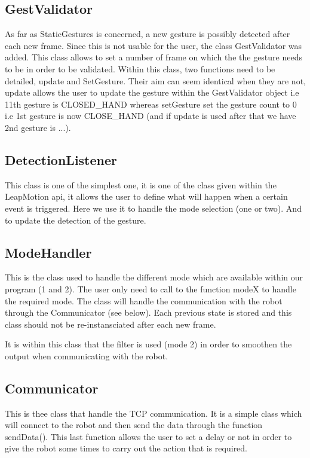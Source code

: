 \subsection{GestValidator}

As far as StaticGestures is concerned, a new gesture is possibly detected after each new frame. Since this is not usable for the user, the class GestValidator was added. This class allows to set a number of frame on which the the gesture needs to be in order to be validated.
Within this class, two functions need to be detailed, update and SetGesture. Their aim can seem identical when they are not, update allows the user to update the gesture within the GestValidator object i.e 11th gesture is CLOSED\_HAND whereas setGesture set the gesture count to 0 i.e 1st gesture is now CLOSE\_HAND (and if update is used after that we have 2nd gesture is ...).

\subsection{DetectionListener}

This class is one of the simplest one, it is one of the class given within the LeapMotion api, it allows the user to define what will happen when a certain event is triggered.
Here we use it to handle the mode selection (one or two). And to update the detection of the gesture.

\subsection{ModeHandler}

This is the class used to handle the different mode which are available within our program (1 and 2). The user only need to call to the function modeX to handle the required mode. The class will handle the communication with the robot through the Communicator (see below). Each previous state is stored and this class should not be re-instansciated after each new frame.

It is within this class that the filter is used (mode 2) in order to smoothen the output when communicating with the robot.

\subsection{Communicator}

This is thee class that handle the TCP communication. It is a simple class which will connect to the robot and then send the data through the function sendData(). This last function allows the user to set a delay or not in order to give the robot some times to carry out the action that is required.
